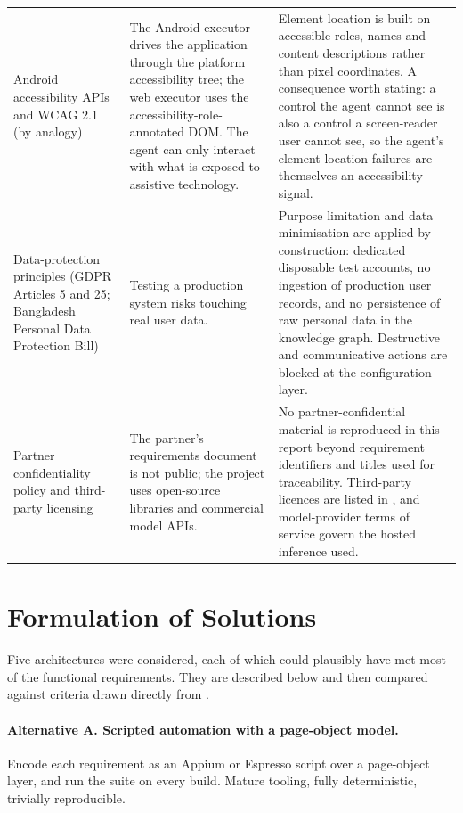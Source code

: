 \begin{xltabular}{\textwidth}{@{}>{\hsize}Y>{\hsize}Y>{\hsize}Y@{}}
  \addlinespace
  Android accessibility APIs and WCAG 2.1 (by analogy) & The Android executor drives the application through the platform accessibility tree; the web executor uses the accessibility-role-annotated DOM. The agent can only interact with what is exposed to assistive technology. & Element location is built on accessible roles, names and content descriptions rather than pixel coordinates. A consequence worth stating: a control the agent cannot see is also a control a screen-reader user cannot see, so the agent's element-location failures are themselves an accessibility signal. \\
  \addlinespace
  Data-protection principles (GDPR Articles 5 and 25; Bangladesh Personal Data Protection Bill) & Testing a production system risks touching real user data. & Purpose limitation and data minimisation are applied by construction: dedicated disposable test accounts, no ingestion of production user records, and no persistence of raw personal data in the knowledge graph. Destructive and communicative actions are blocked at the configuration layer. \\
  \addlinespace
  Partner confidentiality policy and third-party licensing & The partner's requirements document is not public; the project uses open-source libraries and commercial model APIs. & No partner-confidential material is reproduced in this report beyond requirement identifiers and titles used for traceability. Third-party licences are listed in , and model-provider terms of service govern the hosted inference used. \\
\end{xltabular}
\endgroup

\section{Formulation of Solutions}
\label{sec:alternatives}

Five architectures were considered, each of which could plausibly have met most
of the functional requirements. They are described below and then compared
against criteria drawn directly from
.

\paragraph{Alternative A. Scripted automation with a page-object model.}
Encode each requirement as an Appium or Espresso script over a page-object
layer, and run the suite on every build. Mature tooling, fully deterministic,
trivially reproducible.

